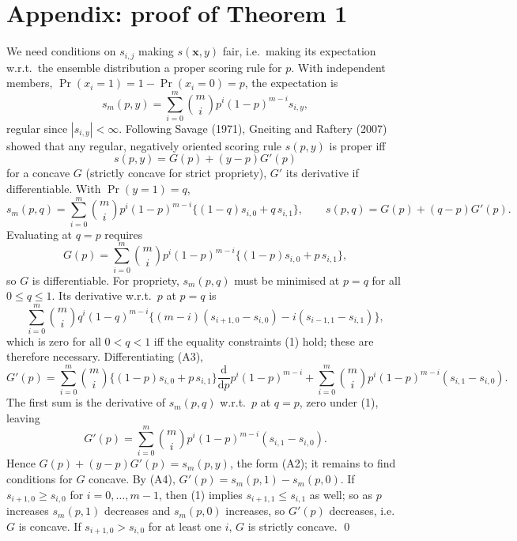 \documentclass{article}
\newcommand{\bx}{\mathbf{x}}
\newcommand{\dd}{\mathrm{d}}
\begin{document}
\section*{Appendix: proof of Theorem 1}
We need conditions on $s_{i,j}$ making $s(\bx,y)$ fair, i.e.\ making its
expectation w.r.t.\ the ensemble distribution a proper scoring rule for $p$.
With independent members, $\Pr(x_i=1)=1-\Pr(x_i=0)=p$, the expectation is
\begin{equation}\tag{A1}
  s_m(p,y) = \sum_{i=0}^m \binom{m}{i} p^i(1-p)^{m-i} s_{i,y},
\end{equation}
regular since $|s_{i,y}|<\infty$. Following Savage (1971), Gneiting and Raftery
(2007) showed that any regular, negatively oriented scoring rule $s(p,y)$ is
proper iff
\begin{equation}\tag{A2}
  s(p,y) = G(p) + (y-p)G'(p)
\end{equation}
for a concave $G$ (strictly concave for strict propriety), $G'$ its derivative
if differentiable. With $\Pr(y=1)=q$,
\[
  s_m(p,q) = \sum_{i=0}^m\binom{m}{i}p^i(1-p)^{m-i}\{(1-q)s_{i,0}+q\,s_{i,1}\},
  \qquad s(p,q) = G(p)+(q-p)G'(p).
\]
Evaluating at $q=p$ requires
\begin{equation}\tag{A3}
  G(p) = \sum_{i=0}^m\binom{m}{i}p^i(1-p)^{m-i}\{(1-p)s_{i,0}+p\,s_{i,1}\},
\end{equation}
so $G$ is differentiable. For propriety, $s_m(p,q)$ must be minimised at $p=q$
for all $0\le q\le1$. Its derivative w.r.t.\ $p$ at $p=q$ is
\[
  \sum_{i=0}^m\binom{m}{i}q^i(1-q)^{m-i}\{(m-i)(s_{i+1,0}-s_{i,0}) - i(s_{i-1,1}-s_{i,1})\},
\]
which is zero for all $0<q<1$ iff the equality constraints (1) hold; these are
therefore necessary. Differentiating (A3),
\[
  G'(p) = \sum_{i=0}^m\binom{m}{i}\{(1-p)s_{i,0}+p\,s_{i,1}\}\frac{\dd}{\dd p}p^i(1-p)^{m-i}
  + \sum_{i=0}^m\binom{m}{i}p^i(1-p)^{m-i}(s_{i,1}-s_{i,0}).
\]
The first sum is the derivative of $s_m(p,q)$ w.r.t.\ $p$ at $q=p$, zero under
(1), leaving
\begin{equation}\tag{A4}
  G'(p) = \sum_{i=0}^m\binom{m}{i}p^i(1-p)^{m-i}(s_{i,1}-s_{i,0}).
\end{equation}
Hence $G(p)+(y-p)G'(p)=s_m(p,y)$, the form (A2); it remains to find conditions
for $G$ concave. By (A4), $G'(p)=s_m(p,1)-s_m(p,0)$. If $s_{i+1,0}\ge s_{i,0}$
for $i=0,\dots,m-1$, then (1) implies $s_{i+1,1}\le s_{i,1}$ as well; so as $p$
increases $s_m(p,1)$ decreases and $s_m(p,0)$ increases, so $G'(p)$ decreases,
i.e.\ $G$ is concave. If $s_{i+1,0}>s_{i,0}$ for at least one $i$, $G$ is
strictly concave. \qed
\end{document}
